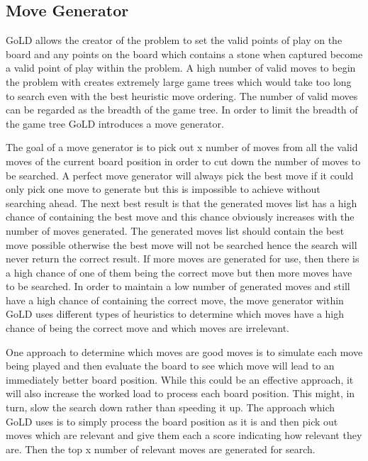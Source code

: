 \documentclass{l4proj}
\begin{document}
\subsection{Move Generator}
GoLD allows the creator of the problem to set the valid points of play on the board and any points on the board which contains a stone when captured become a valid point of play within the problem. A high number of valid moves to begin the problem with creates extremely large game trees which would take too long to search even with the best heuristic move ordering. The number of valid moves can be regarded as the breadth of the game tree. In order to limit the breadth of the game tree GoLD introduces a move generator.

The goal of a move generator is to pick out x number of moves from all the valid moves of the current board position in order to cut down the number of moves to be searched. A perfect move generator will always pick the best move if it could only pick one move to generate but this is impossible to achieve without searching ahead.  The next best result is that the generated moves list has a high chance of containing the best move and this chance obviously increases with the number of moves generated. The generated moves list should contain the best move possible otherwise the best move will not be searched hence the search will never return the correct result. If more moves are generated for use, then there is a high chance of one of them being the correct move but then more moves have to be searched. In order to maintain a low number of generated moves and still have a high chance of containing the correct move, the move generator within GoLD uses different types of heuristics to determine which moves have a high chance of being the correct move and which moves are irrelevant.

One approach to determine which moves are good moves is to simulate each move being played and then evaluate the board to see which move will lead to an immediately better board position. While this could be an effective approach, it will also increase the worked load to process each board position. This might, in turn, slow the search down rather than speeding it up. The approach which GoLD uses is to simply process the board position as it is and then pick out moves which are relevant and give them each a score indicating how relevant they are.  Then the top x number of relevant moves are generated for search.
\end{document}
